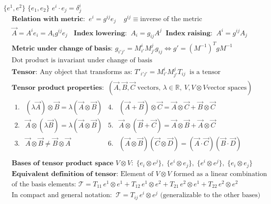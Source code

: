 \underline{} $\{e^1, e^2\}$  $\{e_1, e_2\}$ \; \; $e^i\cdot e_j = \delta^i_j$
\begin{align*}
&\textbf{Relation with metric:} \;\;  e^i = g^{ij} e_j \;\; \;\;g^{ij}\equiv \text{inverse of the metric}\\
&\vec{A} = A^i e_i = A_i g^{ij} e_j \; \; \textbf{ Index lowering:} \;\;  A_i = g_{ij} A^j \;\;  \textbf{Index raising:} \;\;  A^i = g^{ij} A_j \\
&\textbf{Metric under change of basis: } g_{i'j'} = M^i_{i'} M^j_{j'} g_{ij} \Leftrightarrow  g' = (M^{-1})^T g M^{-1} \\
&\text{Dot product is invariant under change of basis} \\
&\textbf{Tensor: } \text{Any object that transforms as: }T'_{i'j'} = M^i_{i'} M^j_{j'} T_{ij} \;\;  \text{is a tensor} \\
&\textbf{Tensor product properties:} \;\;  (\vec{A}, \vec{B}, \vec{C} \text{ vectors, } \lambda \in \mathbb{R}, \ V, V\otimes V \text{vector spaces})\\
&\begin{array}{rlrl}
\text{1.} & (\lambda \vec{A}) \otimes \vec{B} = \lambda (\vec{A} \otimes \vec{B}) & 
\text{4.} & (\vec{A} + \vec{B}) \otimes \vec{C} = \vec{A} \otimes \vec{C} + \vec{B} \otimes \vec{C} \\
\text{2.} & \vec{A} \otimes (\lambda \vec{B}) = \lambda (\vec{A} \otimes \vec{B}) & 
\text{5.} & \vec{A} \otimes (\vec{B} + \vec{C}) = \vec{A} \otimes \vec{B} + \vec{A} \otimes \vec{C} \\
\text{3.} & \vec{A} \otimes \vec{B} \neq \vec{B} \otimes \vec{A} & 
\text{6.} & (\vec{A} \otimes \vec{B})(\vec{C} \otimes \vec{D}) = (\vec{A} \cdot \vec{C})(\vec{B} \cdot \vec{D}) \\
\end{array}\\
&\textbf{Bases of tensor product space } V \otimes V:\; \{e_i \!\otimes\! e^j\},\;  \{e^i\! \otimes\! e_j\},\;  \{e^i \!\otimes \!e^j\},\; \{e_i \!\otimes \!e_j\} \\
&\textbf{Equivalent definition of tensor:} \text{ Element of } V \otimes V \text{ formed as a linear combination} \\
&\text{of the basis elements: } \mathcal{T} = T_{11}\, e^1 \otimes e^1 + T_{12}\, e^1 \otimes e^2 + T_{21}\, e^2 \otimes e^1 + T_{22}\, e^2 \otimes e^2 \\
&\text{In compact and general notation:} \;\; \mathcal{T} = T_{ij}\, e^i \otimes e^j \text{ (generalizable to the other bases)}
\end{align*}
